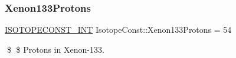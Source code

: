 \subsubsection{\texorpdfstring{Xenon133\+Protons}{Xenon133Protons}}
{\footnotesize\ttfamily \mbox{\hyperlink{group___isotope_const-_macros_ga5f18360b3e99483a35c32d789e62621c}{I\+S\+O\+T\+O\+P\+E\+C\+O\+N\+S\+T\+\_\+\+I\+NT}} Isotope\+Const\+::\+Xenon133\+Protons = 54}

\$ \$ Protons in Xenon-\/133. 